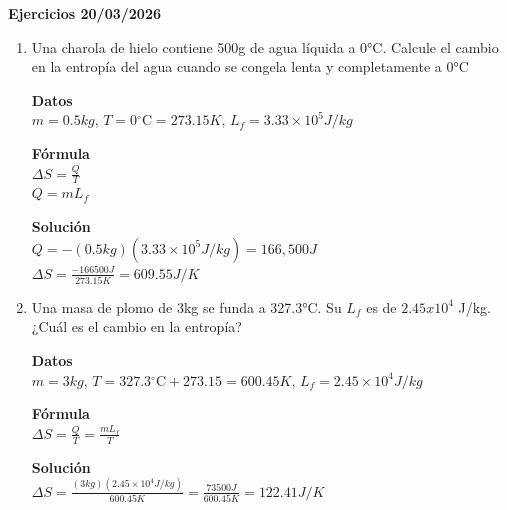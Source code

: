 \documentclass[a4paper, 11pt]{article}
\newcommand{\Pspace}{0.5cm}
\newcommand{\Aspace}{0.2cm}
\begin{document}
    \newpage
    {\Large \textbf{Ejercicios 20/03/2026}}
    \begin{enumerate}
    \vspace{\Pspace}
    \item Una charola de hielo contiene 500g de agua líquida a 0°C. Calcule el cambio en la entropía del agua cuando se congela lenta y completamente a 0°C \par
        \vspace{\Aspace} \par
        { \color{azul} 
            \textbf{Datos} \\
            $m = 0.5kg$, $T = 0\mathrm{^\circ C} = 273.15K$, $L_f = 3.33 \times 10^5 J/kg$ \par

            \textbf{Fórmula} \\
            $\Delta S = \frac{Q}{T}$ \\
            $Q = m L_f$ \par

            \textbf{Solución} \\
            $Q = -(0.5 kg)(3.33 \times 10^5 J/kg) = 166,500 J$ \\
            $\Delta S = \frac{-166500 J}{273.15 K} = 609.55 J/K$
        }



    \vspace{\Pspace}
    \item Una masa de plomo de 3kg se funda a 327.3°C. Su $L_{f}$ es de $2.45x10^{4}$ J/kg. ¿Cuál es el cambio en la entropía? \par
        \vspace{\Aspace} \par
        { \color{azul} 
            \textbf{Datos} \\
            $m = 3kg$, $T = 327.3\mathrm{^\circ C} + 273.15 = 600.45K$, $L_f = 2.45 \times 10^4 J/kg$ \par

            \textbf{Fórmula} \\
            $\Delta S = \frac{Q}{T} = \frac{m L_f}{T}$ \par

            \textbf{Solución} \\
            $\Delta S = \frac{(3 kg)(2.45 \times 10^4 J/kg)}{600.45 K} = \frac{73500 J}{600.45 K} = 122.41 J/K$
        }




\end{enumerate}
\end{document}
